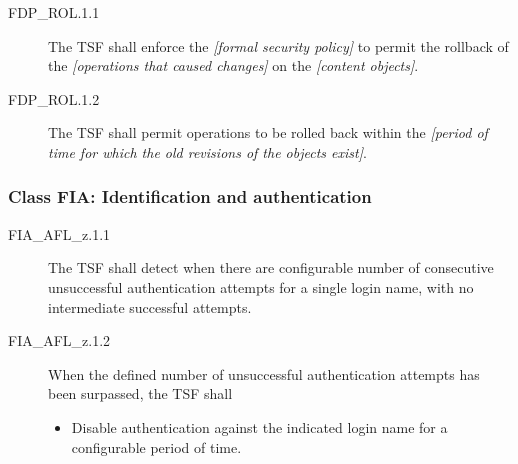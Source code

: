 \documentclass[12pt,english]{scrbook}
\begin{document}
\begin{description}
\item[FDP{\_}ROL.1.1 ]

The TSF shall enforce the \emph{{[}formal security policy]} to permit
the rollback of the \emph{{[}operations that caused changes]} on the \emph{{[}content
objects]}.

\item[FDP{\_}ROL.1.2 ]

The TSF shall permit operations to be rolled back
within the \emph{{[}period of time for which the old revisions of the objects
exist]}.

\end{description}





\subsubsection{Class FIA: Identification and authentication}





\begin{description}
\item[FIA{\_}AFL{\_}z.1.1]

The TSF shall detect when there are configurable number of consecutive
unsuccessful authentication attempts for a single login name,
with no intermediate successful attempts.

\item[FIA{\_}AFL{\_}z.1.2 ]

When the defined number of unsuccessful authentication attempts
has been surpassed, the TSF shall
\begin{itemize}
\item {} 
Disable authentication against the indicated login name for a
configurable period of time.

\end{itemize}

\end{description}
\end{document}
